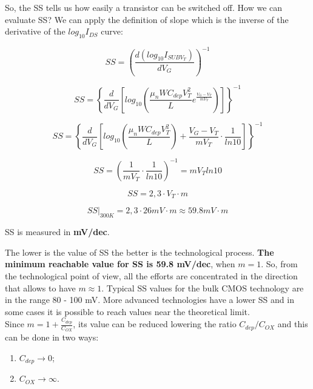 \documentclass[a4paper, 12pt, twoside, openright]{report}
\begin{document}
So, the SS tells us how easily a transistor can be switched off. How we can evaluate SS? We can apply the definition of slope which is the inverse of the derivative of the $log_{10}I_{DS}$ curve:

	\begin{equation}
	SS = \left( \frac{d(log_{10}I_{SUBV_T})}{dV_G} \right)^{-1}
	\label{}
	\end{equation}
	
	\begin{equation}
	SS = \left \{ \frac{d}{dV_G} \left[ log_{10} \left( \frac{\mu_n W C_{dep} V_T^2}{L} e^{\frac{V_G - V_T}{m V_T}} \right) \right] \right \}^{-1}
	\label{}
	\end{equation}
	
	\begin{equation}
	SS = \left \{ \frac{d}{dV_G} \left[ log_{10} \left( \frac{\mu_n W C_{dep} V_T^2}{L} \right) + \frac{V_G - V_T}{m V_T} \cdot \frac{1}{ln10} \right] \right \}^{-1}
	\label{}
	\end{equation}
	
	\begin{equation}
	SS = \left( \frac{1}{m V_T} \cdot \frac{1}{ln10} \right)^{-1} = m V_T ln10
	\label{}
	\end{equation}
	
	\begin{equation}
	SS = 2,3 \cdot V_T \cdot m
	\label{}
	\end{equation}
	
	\begin{equation}
	SS|_{300K}  = 2,3 \cdot 26mV \cdot m \approx 59.8 mV \cdot m
	\label{}
	\end{equation}

SS is measured in \textbf{mV/dec}.

The lower is the value of SS the better is the technological process. \textbf{The minimum reachable value for SS is 59.8 mV/dec}, when $m = 1$. So, from the technological point of view, all the efforts are concentrated in the direction that allows to have $m \approx 1$. Typical SS values for the bulk CMOS technology are in the range 80 - 100 mV. More advanced technologies have a lower SS and in some cases it is possible to reach values near the theoretical limit.\\
Since $m = 1+ \frac{C_{dep}}{C_{OX}}$, its value can be reduced lowering the ratio $C_{dep}/C_{OX}$ and this can be done in two ways:

\begin{enumerate}
\item $C_{dep} \rightarrow 0$;
\item $C_{OX} \rightarrow \infty$.
\end{enumerate}
\end{document}
